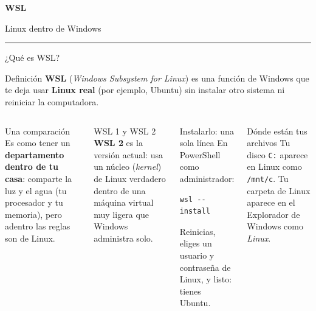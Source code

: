 \documentclass[aspectratio=169,10pt,c]{beamer}
\begin{document}
\begin{frame}[plain]
\vfill
\begin{center}
{\fontsize{29}{34}\selectfont\bfseries WSL}\par
\vspace{2mm}
{\small Linux dentro de Windows}\par
\vspace{4mm}
{\color{utpRojo}\rule{8.5cm}{1.2pt}}
\end{center}
\vfill
\end{frame}

\begin{frame}[fragile]{¿Qué es WSL?}
\begin{block}{Definición}
\small \textbf{WSL} (\emph{Windows Subsystem for Linux}) es una función de Windows que te deja usar \textbf{Linux real} (por ejemplo, Ubuntu) sin instalar otro sistema ni reiniciar la computadora.
\end{block}
\begin{columns}[T,onlytextwidth]
\begin{exampleblock}{Una comparación}
\small Es como tener un \textbf{departamento dentro de tu casa}: comparte la luz y el agua (tu procesador y tu memoria), pero adentro las reglas son de Linux.
\end{exampleblock}
\begin{block}{WSL 1 y WSL 2}
\small \textbf{WSL 2} es la versión actual: usa un núcleo (\emph{kernel}) de Linux verdadero dentro de una máquina virtual muy ligera que Windows administra solo.
\end{block}
\begin{exampleblock}{Instalarlo: una sola línea}
\small En PowerShell como administrador:
\begin{lstlisting}
wsl --install
\end{lstlisting}
\small Reinicias, eliges un usuario y contraseña de Linux, y listo: tienes Ubuntu.
\end{exampleblock}
\begin{alertblock}{Dónde están tus archivos}
\small Tu disco \texttt{C:} aparece en Linux como \texttt{/mnt/c}. Tu carpeta de Linux aparece en el Explorador de Windows como \emph{Linux}.
\end{alertblock}
\end{columns}
\end{frame}
\end{document}
